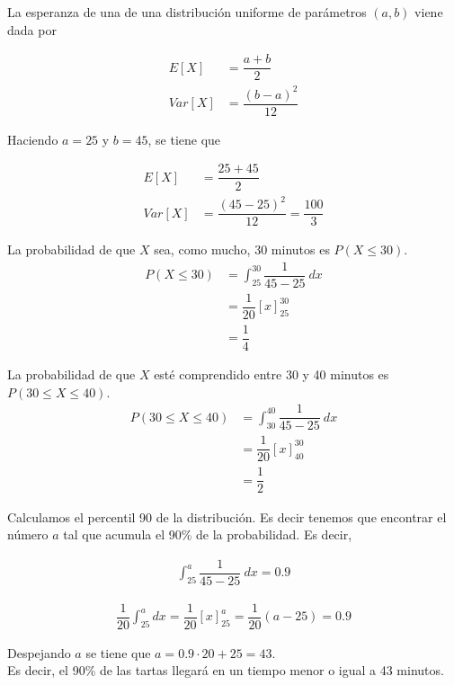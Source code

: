 \documentclass[12pt,a4paper,twoside,openright,titlepage,final]{article}
\begin{document}
La esperanza de una de una distribución uniforme de parámetros $(a, b)$ viene dada por

\begin{align*}
E[X] & = \dfrac{a + b}{2}\\
Var[X] & = \dfrac{(b-a)^2}{12}
\end{align*}

Haciendo $a = 25$ y $b = 45$, se tiene que

\begin{align*}
E[X] & = \dfrac{25+45}{2}\\
Var[X] & = \dfrac{(45-25)^2}{12} = \dfrac{100}{3}
\end{align*}

La probabilidad de que $X$ sea, como mucho, 30 minutos es $P(X \leq 30)$.\\

\begin{align*}
P(X \leq 30) & = \int_{25}^{30} \dfrac{1}{45 -25} \ dx \\
& = \dfrac{1}{20}\left[x\right]_{25}^{30} \\ & = \dfrac{1}{4}
\end{align*}

La probabilidad de que $X$ esté comprendido entre 30 y 40 minutos es $P(30 \leq X \leq 40)$.\\

\begin{align*}
P(30 \leq X \leq 40) & = \int_{30}^{40} \dfrac{1}{45 -25} \ dx \\
& = \dfrac{1}{20}\left[x\right]_{40}^{30} \\ & = \dfrac{1}{2}
\end{align*}

Calculamos el percentil 90 de la distribución. Es decir tenemos que encontrar el número $a$ tal que acumula el 90\% de la probabilidad. Es decir,

\begin{align*}
\int_{25}^{a} \dfrac{1}{45 - 25} \ dx = 0.9
\end{align*}

\begin{align*}
\dfrac{1}{20}\int_{25}^{a} dx = \dfrac{1}{20} \left[x\right]_{25}^{a} = \dfrac{1}{20}(a - 25) = 0.9
\end{align*}

Despejando $a$ se tiene que $a = 0.9 \cdot 20 + 25 = 43$.\\

Es decir, el 90\% de las tartas llegará en un tiempo menor o igual a 43 minutos.\\
\end{document}
